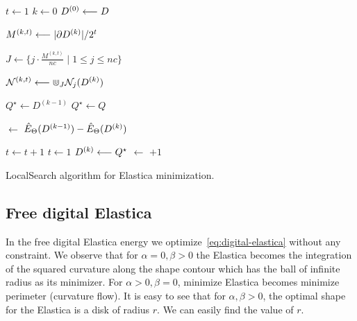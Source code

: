 \begin{algorithm}[H]
 
 \BlankLine
 $t \longleftarrow 1$ 
 $k \longleftarrow 0$	
 $D^{(0)} \longleftarrow D$\;
 { 	
	$M^{(k,t)}  \longleftarrow |\partial D^{(k)}|/2^t$  	
	
	$J \longleftarrow \{ j \cdot \frac{M^{(k,t)}}{nc} \; | \; 1 \leq j \leq nc \} $\;
	
	$\displaystyle \mathcal{N}^{(k,t)} \longleftarrow \displaystyle \Cup_{J}{\mathcal{N}_{j}(D^{(k)})}$\;
	\BlankLine
	
	$Q^{\star} \longleftarrow D^{(k-1)}$\;
	{
		{
			$Q^\star \longleftarrow Q$\; 
		}	
	}
	\BlankLine
	

	\Delta $\longleftarrow$ $\hat{E}_{\Theta}(D^{(k-1)}) - \hat{E}_{\Theta}(D^{(k)})$\;	
	
	{
		$t \longleftarrow t+1$ 
	}		
	\Else 
	{ 
		$t \longleftarrow 1$\;	
		$D^{(k)} \longleftarrow Q^\star$\;
		\It $\longleftarrow$ \It $+1$\;		
	}
	
 }
 \caption{LocalSearch algorithm for Elastica minimization.}
  \label{alg:local-search} 
\end{algorithm}

\subsection{Free digital Elastica}
\label{ch6:subsec:free-digital-elastica}
In the free digital Elastica energy we optimize~\cref{eq:digital-elastica} without any constraint. We observe that for $\alpha=0, \beta >0$ the Elastica becomes the integration of the squared curvature  along the shape contour which has the ball of infinite radius as its minimizer. For $\alpha > 0, \beta=0$, minimize Elastica becomes minimize perimeter (curvature flow). It is easy to see that for $\alpha, \beta > 0$, the optimal shape for the Elastica is a disk of radius $r$. We can easily find the value of $r$.

